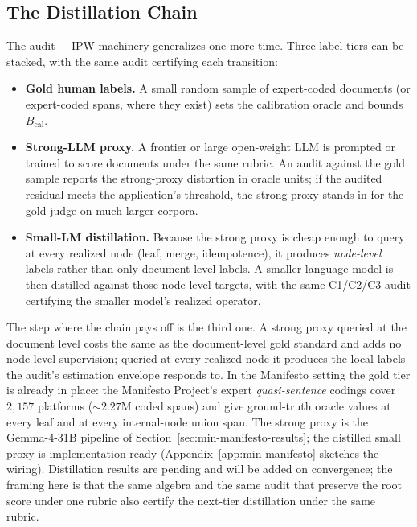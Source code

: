 \subsection{The Distillation Chain}\label{sec:min-distillation}

The audit + IPW machinery generalizes one more time. Three label tiers can
be stacked, with the same audit certifying each transition:

\begin{itemize}[leftmargin=1.5em]
\item \textbf{Gold human labels.} A small random sample of expert-coded
documents (or expert-coded spans, where they exist) sets the calibration
oracle and bounds $B_{\mathrm{cal}}$.
\item \textbf{Strong-LLM proxy.} A frontier or large open-weight LLM is
prompted or trained to score documents under the same rubric. An audit
against the gold sample reports the strong-proxy distortion in oracle
units; if the audited residual meets the application's threshold, the
strong proxy stands in for the gold judge on much larger corpora.
\item \textbf{Small-LM distillation.} Because the strong proxy is cheap
enough to query at every realized node (leaf, merge, idempotence), it
produces \emph{node-level} labels rather than only document-level labels.
A smaller language model is then distilled against those node-level
targets, with the same C1/C2/C3 audit certifying the smaller model's
realized operator.
\end{itemize}

The step where the chain pays off is the third one. A strong proxy queried
at the document level costs the same as the document-level gold standard
and adds no node-level supervision; queried at every realized node it
produces the local labels the audit's estimation envelope responds to. In the Manifesto
setting the gold tier is already in place: the Manifesto Project's expert
\emph{quasi-sentence} codings cover $2{,}157$ platforms ($\sim\!2.27$M
coded spans) and give ground-truth oracle values at every leaf and at
every internal-node union span. The strong proxy is the Gemma-4-31B
pipeline of Section~\ref{sec:min-manifesto-results}; the distilled small
proxy is implementation-ready (Appendix~\ref{app:min-manifesto} sketches
the wiring). Distillation results are pending and will be added on
convergence; the framing here is that the same algebra and the same audit
that preserve the root score under one rubric also certify the next-tier
distillation under the same rubric.

